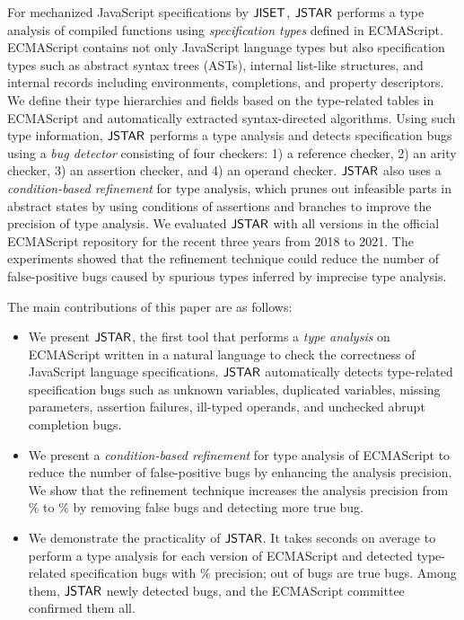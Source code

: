 For mechanized JavaScript specifications by $\jiset$, $\tool$ performs
a type analysis of compiled functions using \textit{specification types}
defined in ECMAScript. ECMAScript contains not only JavaScript
language types but also specification types such as abstract syntax
trees (ASTs), internal list-like structures, and internal records
including environments, completions, and property descriptors. We
define their type hierarchies and fields based on the type-related
tables in ECMAScript and automatically extracted syntax-directed algorithms.
Using such type information, $\tool$ performs a type analysis and detects specification bugs using
a \textit{bug detector} consisting of four checkers: 1) a reference
checker, 2) an arity checker, 3) an assertion checker, and 4) an operand checker.
$\tool$ also uses a \textit{condition-based refinement} for type
analysis, which prunes out infeasible parts in abstract states by using conditions
of assertions and branches to improve the precision of type analysis.
We evaluated $\tool$ with all  versions in the official
ECMAScript repository for the recent three years from 2018 to 2021.
The experiments showed that the refinement technique could reduce the number of
false-positive bugs caused by spurious types inferred by imprecise type analysis.

The main contributions of this paper are as follows:
\begin{itemize}
  \item We present $\tool$, the first tool that performs a \textit{type
    analysis} on ECMAScript written in a natural language to check the correctness of JavaScript language
    specifications.  $\tool$ automatically detects type-related specification
    bugs such as unknown variables, duplicated variables, missing
    parameters, assertion failures, ill-typed operands, and unchecked
    abrupt completion bugs.
  \item We present a \textit{condition-based refinement} for type analysis of
    ECMAScript to reduce the number of false-positive bugs by enhancing the analysis
    precision.  We show that the refinement technique increases the analysis
    precision from \% to \% by removing 
    false bugs and detecting  more true bug.
  \item We demonstrate the practicality of $\tool$. It takes 
    seconds on average to perform a type analysis for each version of ECMAScript and detected
     type-related specification bugs with \% precision;
     out of  bugs are true bugs.  Among them, $\tool$
    newly detected  bugs, and the ECMAScript committee confirmed them all.
\end{itemize}
